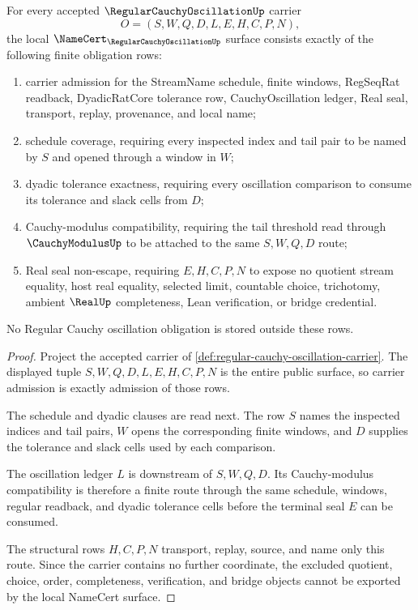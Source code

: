 \begin{theorem}
\label{thm:regular-cauchy-oscillation-namecert-obligations}
For every accepted $\RegularCauchyOscillationUp$ carrier
$$
O=(S,W,Q,D,L,E,H,C,P,N),
$$
the local $\NameCert_{\RegularCauchyOscillationUp}$ surface consists exactly of the following finite obligation rows:
\begin{enumerate}
\item carrier admission for the StreamName schedule, finite windows, RegSeqRat readback, DyadicRatCore tolerance row, CauchyOscillation ledger, Real seal, transport, replay, provenance, and local name;
\item schedule coverage, requiring every inspected index and tail pair to be named by $S$ and opened through a window in $W$;
\item dyadic tolerance exactness, requiring every oscillation comparison to consume its tolerance and slack cells from $D$;
\item Cauchy-modulus compatibility, requiring the tail threshold read through $\CauchyModulusUp$ to be attached to the same $S,W,Q,D$ route;
\item Real seal non-escape, requiring $E,H,C,P,N$ to expose no quotient stream equality, host real equality, selected limit, countable choice, trichotomy, ambient $\RealUp$ completeness, Lean verification, or bridge credential.
\end{enumerate}
No Regular Cauchy oscillation obligation is stored outside these rows.
\end{theorem}
\begin{proof}
Project the accepted carrier of \autoref{def:regular-cauchy-oscillation-carrier}. The displayed tuple $S,W,Q,D,L,E,H,C,P,N$ is the entire public surface, so carrier admission is exactly admission of those rows.

The schedule and dyadic clauses are read next. The row $S$ names the inspected indices and tail pairs, $W$ opens the corresponding finite windows, and $D$ supplies the tolerance and slack cells used by each comparison.

The oscillation ledger $L$ is downstream of $S,W,Q,D$. Its Cauchy-modulus compatibility is therefore a finite route through the same schedule, windows, regular readback, and dyadic tolerance cells before the terminal seal $E$ can be consumed.

The structural rows $H,C,P,N$ transport, replay, source, and name only this route. Since the carrier contains no further coordinate, the excluded quotient, choice, order, completeness, verification, and bridge objects cannot be exported by the local NameCert surface.
\end{proof}

